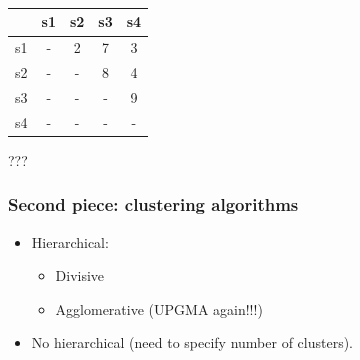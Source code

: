 \begin{frame}
\frametitle{}

\begin{center}
\begin{tabular}{c||c|c|c|c|}
   &   s1   &   s2   &    s3   &   s4 \\
\hline
\hline
s1 &   -    &   2    &     7   &    3 \\
\hline
s2 &   -    &   -    &     8   &    4 \\
\hline
s3 &   -    &   -    &     -   &    9 \\
\hline
s4 &   -    &   -    &     -   &    - \\
\hline
\end{tabular} 

\end{center}
\vspace*{12pt}

\centerline{???}


\end{frame}







\begin{frame}
\frametitle{Second piece: clustering algorithms}
\begin{itemize}
\item Hierarchical:
\begin{itemize}
\item Divisive
\item Agglomerative (UPGMA again!!!)
\end{itemize}
\item No hierarchical (need to specify number of clusters).
\end{itemize}
\end{frame}







